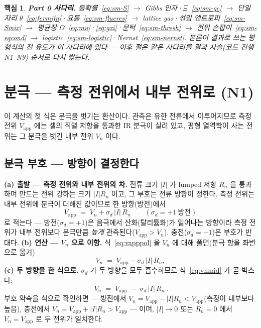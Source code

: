 \documentclass[11pt,a4paper]{article}
\newtheorem*{keybox}{핵심}
\newcommand{\app}{\mathrm{app}}
\begin{document}
\begin{keybox}
\textbf{Part 0 사다리.} 등확률~\eqref{eq:sm-S} $\to$ Gibbs 인자·$\Xi$~\eqref{eq:sm-gc} $\to$ 단일 자리
$\theta$~\eqref{eq:fermifn}·요동~\eqref{eq:sm-flucres} $\to$ lattice gas·섞임 엔트로피~\eqref{eq:sm-Smix}
$\to$ 평균장 $\Omega$~\eqref{eq:mu}·\eqref{eq:gxi}·문턱~\eqref{eq:sm-thresh} $\to$ 전위
손잡이~\eqref{eq:sm-eqcond} $\to$ logistic~\eqref{eq:sm-logistic}·Nernst~\eqref{eq:sm-nernst}. 본론이 결과로
쓰는 평형식의 전 유도가 이 사다리에 있다 --- 이후 절은 같은 사다리를 결과 사슬(코드 진행 N1--N9) 순서로
다시 밟는다.
\end{keybox}

\section{분극 — 측정 전위에서 내부 전위로 (N1)}\label{sec:pol}
이 계산의 첫 식은 분극을 벗기는 환산이다. 관측은 유한 전류에서 이루어지므로 측정 전위 $V_\app$ 에는 셀의
직렬 저항을 통과한 IR 분극이 실려 있고, 평형 열역학이 사는 전위는 그 분극을 벗긴 내부 전위 $V_n$ 이다.

\subsection{분극 부호 — 방향이 결정한다}
\textbf{(a) 출발 — 측정 전위와 내부 전위의 차.} 전류 크기 $|I|$ 가 lumped 저항 $R_n$ 을 통과하며 만드는 전위 강하는
크기 $|I|R_n$ 이고, 그 부호는 전류 방향이 정한다. 측정 전위는 내부 전위에 분극이 더해진 값이므로 한 방향(방전)에서
\begin{equation}
V_\app\;=\;V_n+\sigma_d\,|I|\,R_n
\qquad(\sigma_d=+1\ \text{방전})
\label{eq:vapppol}
\end{equation}
로 적는다 — 방전($\sigma_d=+1$)은 음극에서 산화(탈리튬화)가 일어나는 방향이라 측정 전위가 내부 전위보다 분극만큼
\emph{높게} 관측된다($V_\app>V_n$). 충전($\sigma_d=-1$)은 부호가 반대다. \textbf{(b) 연산 — $V_n$ 으로 이항.}
식~\eqref{eq:vapppol} 을 $V_n$ 에 대해 풀면(분극 항을 좌변으로 옮겨)
\begin{equation}
V_n\;=\;V_\app-\sigma_d\,|I|\,R_n,
\label{eq:vnmid}
\end{equation}
\textbf{(c) 두 방향을 한 식으로.} $\sigma_d$ 가 두 방향을 모두 흡수하므로 식~\eqref{eq:vnmid} 가 곧 박스다:
\begin{equation}
\boxed{\;V_n\;=\;V_\app\;-\;\sigma_d\,|I|\,R_n\;.}
\label{eq:vn}
\end{equation}
부호 약속을 식으로 확인하면 —
방전에서 $V_n=V_\app-|I|R_n<V_\app$(측정이 내부보다 높음), 충전에서 $V_n=V_\app+|I|R_n>V_\app$ — 이며,
$|I|\to0$ 또는 $R_n=0$ 에서 $V_n=V_\app$ 로 두 전위가 일치한다.
\end{document}
